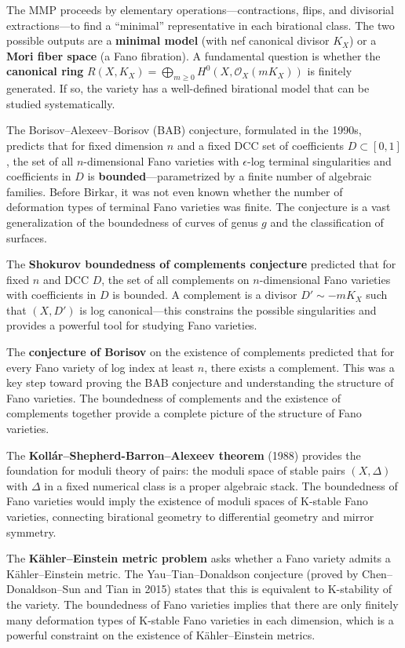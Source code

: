 The MMP proceeds by elementary operations---contractions, flips, and divisorial extractions---to find a ``minimal'' representative in each birational class. The two possible outputs are a \textbf{minimal model} (with nef canonical divisor $K_X$) or a \textbf{Mori fiber space} (a Fano fibration). A fundamental question is whether the \textbf{canonical ring} $R(X, K_X) = \bigoplus_{m \ge 0} H^0(X, \mathcal{O}_X(mK_X))$ is finitely generated. If so, the variety has a well-defined birational model that can be studied systematically.

The Borisov--Alexeev--Borisov (BAB) conjecture, formulated in the 1990s, predicts that for fixed dimension $n$ and a fixed DCC set of coefficients $D \subset [0,1]$, the set of all $n$-dimensional Fano varieties with $\epsilon$-log terminal singularities and coefficients in $D$ is \textbf{bounded}---parametrized by a finite number of algebraic families. Before Birkar, it was not even known whether the number of deformation types of terminal Fano varieties was finite. The conjecture is a vast generalization of the boundedness of curves of genus $g$ and the classification of surfaces.

The \textbf{Shokurov boundedness of complements conjecture} predicted that for fixed $n$ and DCC $D$, the set of all complements on $n$-dimensional Fano varieties with coefficients in $D$ is bounded. A complement is a divisor $D' \sim -mK_X$ such that $(X, D')$ is log canonical---this constrains the possible singularities and provides a powerful tool for studying Fano varieties.

The \textbf{conjecture of Borisov} on the existence of complements predicted that for every Fano variety of log index at least $n$, there exists a complement. This was a key step toward proving the BAB conjecture and understanding the structure of Fano varieties. The boundedness of complements and the existence of complements together provide a complete picture of the structure of Fano varieties.

The \textbf{Koll\'ar--Shepherd-Barron--Alexeev theorem} (1988) provides the foundation for moduli theory of pairs: the moduli space of stable pairs $(X, \Delta)$ with $\Delta$ in a fixed numerical class is a proper algebraic stack. The boundedness of Fano varieties would imply the existence of moduli spaces of K-stable Fano varieties, connecting birational geometry to differential geometry and mirror symmetry.

The \textbf{K\"ahler--Einstein metric problem} asks whether a Fano variety admits a K\"ahler--Einstein metric. The Yau--Tian--Donaldson conjecture (proved by Chen--Donaldson--Sun and Tian in 2015) states that this is equivalent to K-stability of the variety. The boundedness of Fano varieties implies that there are only finitely many deformation types of K-stable Fano varieties in each dimension, which is a powerful constraint on the existence of K\"ahler--Einstein metrics.

